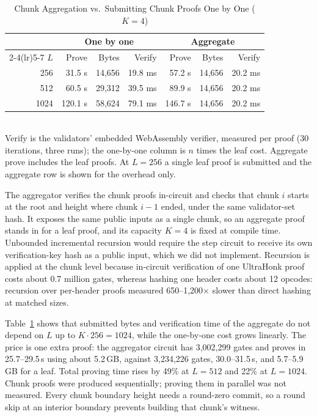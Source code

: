 \begin{table}[h]
\caption{Chunk Aggregation vs.\ Submitting Chunk Proofs One by One ($K{=}4$)}
\label{tab:aggregation}
\centering
\footnotesize
\begin{tabular}{@{}rrrrrrr@{}}
\toprule
 & \multicolumn{3}{c}{\textbf{One by one}} & \multicolumn{3}{c}{\textbf{Aggregate}} \\
\cmidrule(lr){2-4}\cmidrule(lr){5-7}
$L$ & Prove & Bytes & Verify & Prove & Bytes & Verify \\
\midrule
256  & 31.5 s  & 14{,}656 & 19.8 ms & 57.2 s  & 14{,}656 & 20.2 ms \\
512  & 60.5 s  & 29{,}312 & 39.5 ms & 89.9 s  & 14{,}656 & 20.2 ms \\
1024 & 120.1 s & 58{,}624 & 79.1 ms & 146.7 s & 14{,}656 & 20.2 ms \\
\bottomrule
\end{tabular}
\\[2pt]
\footnotesize Verify is the validators' embedded WebAssembly verifier, measured
per proof (30 iterations, three runs); the one-by-one column is $n$ times the
leaf cost. Aggregate prove includes the leaf proofs. At $L{=}256$ a single
leaf proof is submitted and the aggregate row is shown for the overhead only.
\end{table}

The aggregator verifies the chunk proofs in-circuit and checks that chunk
$i$ starts at the root and height where chunk $i{-}1$ ended, under the same
validator-set hash. It exposes the same public inputs as a single chunk, so an
aggregate proof stands in for a leaf proof, and its capacity $K{=}4$ is fixed
at compile time. Unbounded incremental recursion would require the step circuit
to receive its own verification-key hash as a public input, which we did not
implement. Recursion is applied at the chunk level because in-circuit
verification of one UltraHonk proof costs about 0.7 million gates, whereas
hashing one header costs about 12 opcodes: recursion over per-header proofs
measured 650--1{,}200$\times$ slower than direct hashing at matched sizes.

Table~\ref{tab:aggregation} shows that submitted bytes and verification time of
the aggregate do not depend on $L$ up to $K \cdot 256 = 1024$, while the
one-by-one cost grows linearly. The price is one extra proof: the aggregator
circuit has 3{,}002{,}299 gates and proves in 25.7--29.5\,s using about 5.2\,GB,
against 3{,}234{,}226 gates, 30.0--31.5\,s, and 5.7--5.9\,GB for a leaf. Total
proving time rises by 49\% at $L{=}512$ and 22\% at $L{=}1024$. Chunk proofs
were produced sequentially; proving them in parallel was not measured. Every
chunk boundary height needs a round-zero commit, so a round skip at an interior
boundary prevents building that chunk's witness.

